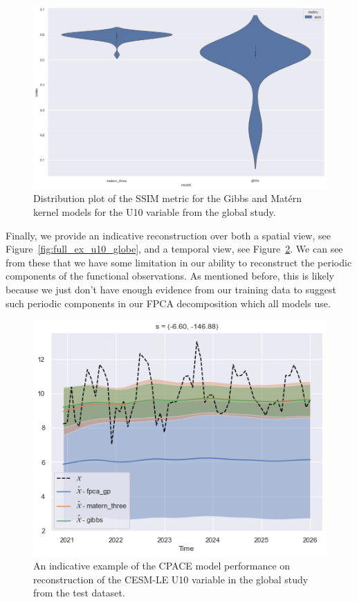 \begin{figure}
	\centering
	\includegraphics[width=\textwidth]{cesm_u10_dist}
	\caption[Distribution plot of the SSIM metric for the Gibbs and Mat\'ern kernel models for the U10 variable from the global study.]{Distribution plot of the SSIM metric for the Gibbs and Mat\'ern kernel models for the U10 variable from the global study.}
	\label{fig:cesm_u10_dist}
\end{figure}

Finally, we provide an indicative reconstruction over both a spatial view, see Figure~\ref{fig:full_ex_u10_globe}, and a temporal view, see Figure~\ref{fig:test_ex_u10_globe}.
We can see from these that we have some limitation in our ability to reconstruct the periodic components of the functional observations.
As mentioned before, this is likely because we just don't have enough evidence from our training data to suggest such periodic components in our FPCA decomposition which all models use.

\begin{figure}
\centering
\includegraphics[width=\textwidth]{test_ex_u10_globe}
\caption[An indicative example of the CPACE model performance on reconstruction of the CESM-LE U10 variable in the global study from the test dataset.]{An indicative example of the CPACE model performance on reconstruction of the CESM-LE U10 variable in the global study from the test dataset.}
\label{fig:test_ex_u10_globe}
\end{figure}

